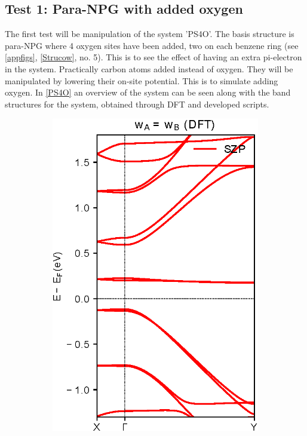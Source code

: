 \subsection{Test 1: Para-NPG with added oxygen}
The first test will be manipulation of the system 'PS4O'. The basis structure is para-NPG where 4 oxygen sites have been added, two on each benzene ring (see \cref{appfigs}, \cref{Strucow}, no. 5). This is to see the effect of having an extra pi-electron in the system. Practically carbon atoms added instead of oxygen. They will be manipulated by lowering their on-site potential. This is to simulate adding oxygen. In \cref{PS4O} an overview of the system can be seen along with the band structures for the system, obtained through DFT and developed scripts.
\begin{figure}[h]
	\centering
	\begin{subfigure}[b]{0.3\textwidth}
		\centering
		\includegraphics[width=\textwidth]{Figures/PS4ODFT.eps}

\end{subfigure}
\end{figure}
